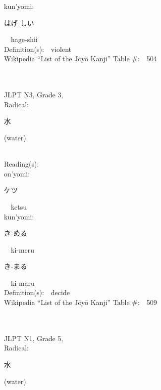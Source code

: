 \begin{multicols}{2}
{\hspace*{1em}}kun'yomi:\ \ \\
{\hspace*{2em}}{\begin{CJK}{UTF8}{min} はげ-しい \end{CJK}}\ \ hage-shii\ \ \\
Definition(s):\ \ violent \\
Wikipedia ``List of the J\=oy\=o Kanji'' Table \#:\ \ 504 \\
\ \ \\
{\fontsize{34pt}{40pt}  }\ \ \\  %
{JLPT N3, Grade 3, \\Radical:\ \ {\begin{CJK}{UTF8}{min} 水 \end{CJK}} (water) } \\
Reading(s):\ \ \\
{\hspace*{1em}}on'yomi:\ \ \\
{\hspace*{2em}}{\begin{CJK}{UTF8}{min} ケツ \end{CJK}}\ \ ketsu\ \ \\
{\hspace*{1em}}kun'yomi:\ \ \\
{\hspace*{2em}}{\begin{CJK}{UTF8}{min} き-める \end{CJK}}\ \ ki-meru\ \ \\
{\hspace*{2em}}{\begin{CJK}{UTF8}{min} き-まる \end{CJK}}\ \ ki-maru\ \ \\
Definition(s):\ \ decide \\
Wikipedia ``List of the J\=oy\=o Kanji'' Table \#:\ \ 509 \\
\ \ \\
{\fontsize{34pt}{40pt}  }\ \ \\  %
{JLPT N1, Grade 5, \\Radical:\ \ {\begin{CJK}{UTF8}{min} 水 \end{CJK}} (water) } \\

\end{multicols}
